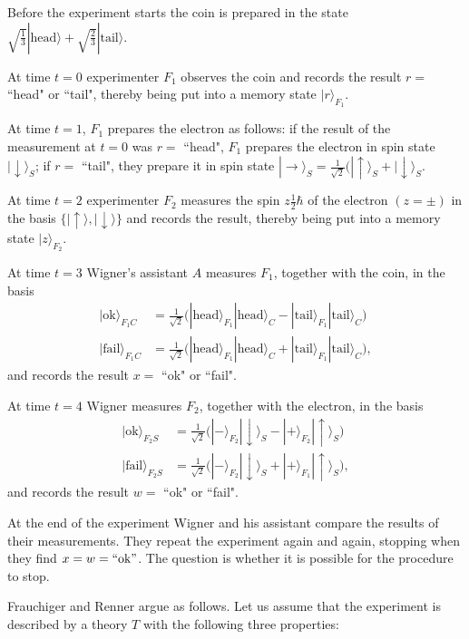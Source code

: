 \documentclass[12pt,reqno]{article}
\newcommand{\head}{\text{head}}
\newcommand{\tail}{\text{tail}}
\newcommand{\ok}{\text{ok}}
\newcommand{\fail}{\text{fail}}
\newcommand{\be}{\begin{equation}}
\newcommand{\ee}{\end{equation}}
\renewcommand{\(}{\left(}
\renewcommand{\)}{\right)}
\renewcommand{\.}{\centerdot}
\newcommand{\1}{\mathbf{1}}
\newcommand{\<}{\langle}
\renewcommand{\>}{\rangle}
\newcommand{\half}{\tfrac{1}{2}}
\newcommand{\third}{\tfrac{1}{3}}
\theoremstyle{definition}
\theoremstyle{remark}
\numberwithin{equation}{section}
\begin{document}

Before the experiment starts the coin is prepared in the state 
$\sqrt{\third}|\head\> + \sqrt{\tfrac{2}{3}}|\tail\>$. 

At time $t = 0$ experimenter $F_1$ observes the coin and records the result $r =$ ``head" or ``tail", thereby being put into a memory state $|r\>_{F_1}$.

At time $t = 1$, $F_1$ prepares the electron as follows: if the result of the measurement at $t = 0$ was $r =$ ``head", $F_1$ prepares the electron in spin state $|\downarrow\>_S$; if $r = $ ``tail", they prepare it in spin state $|\rightarrow\>_S = \tfrac{1}{\sqrt{2}}\big(|\uparrow\>_S + |\downarrow\>_S$. 

At time $t = 2$ experimenter $F_2$ measures the spin $z\half\hbar$ of the electron $(z = \pm)$ in the basis $\{|\uparrow\>, |\downarrow\>\}$ and records the result, thereby being put into a memory state $|z\>_{F_2}$.

At time $t = 3$ Wigner's assistant $A$ measures $F_1$, together with the coin, in the basis
\begin{align*}
|\ok\>_{F_1C} &= \tfrac{1}{\sqrt{2}}\big(|\head\>_{F_1}|\head\>_C - |\tail\>_{F_1}|\tail\>_C\big)\\
|\fail\>_{F_1C} &= \tfrac{1}{\sqrt{2}}\big(|\head\>_{F_1}|\head\>_C + |\tail\>_{F_1}|\tail\>_C\big),
\end{align*}
and records the result $x =$ ``ok" or ``fail".

At time $t = 4$ Wigner measures $F_2$, together with the electron, in the basis
\begin{align*}
|\ok\>_{F_2S} &= \tfrac{1}{\sqrt{2}}\big(|-\>_{F_2}|\downarrow\>_S - |+\>_{F_2}|\uparrow\>_S\big)\\
|\fail\>_{F_2S} &= \tfrac{1}{\sqrt{2}}\big(|-\>_{F_2}|\downarrow\>_S + |+\>_{F_1}|\uparrow\>_S\big),
\end{align*}
and records the result $w =$ ``ok" or ``fail".

At the end of the experiment Wigner and his assistant compare the results of their measurements. They repeat the experiment again and again, stopping when they find $x = w = ``\ok"$. The question is whether it is possible for the procedure to stop.

Frauchiger and Renner argue as follows. Let us assume that the experiment is described by a theory $T$ with the following three properties:
\end{document}
